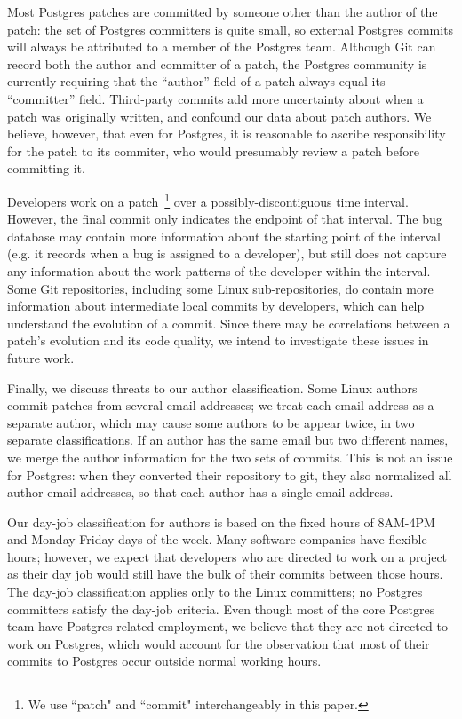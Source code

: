 Most Postgres patches are committed by someone other than the author
of the patch: the set of Postgres committers is quite small, so
external Postgres commits will always be attributed to a member of the
Postgres team. Although Git can record both the author and committer
of a patch, the Postgres community is currently requiring that the
``author'' field of a patch always equal its ``committer'' field.
Third-party commits add more uncertainty about when a patch was
originally written, and confound our data about patch authors.  We
believe, however, that even for Postgres, it is reasonable to ascribe
responsibility for the patch to its commiter, who would presumably
review a patch before committing it. 

Developers work on a patch~\footnote{We use ``patch" and ``commit" interchangeably in this paper.} over a possibly-discontiguous time
interval. However, the final commit only indicates the endpoint of
that interval.  The bug database may contain more information about
the starting point of the interval (e.g. it records when a bug is
assigned to a developer), but still does not capture any information
about the work patterns of the developer within the interval. Some Git
repositories, including some Linux sub-repositories, do contain more
information about intermediate local commits by developers, which can
help understand the evolution of a commit. Since there may be
correlations between a patch's evolution and its code quality, we
intend to investigate these issues in future work.

Finally, we discuss threats to our author classification. Some Linux
authors commit patches from several email addresses; we treat each
email address as a separate author, which may cause some authors to be
appear twice, in two separate classifications. If an author has the
same email but two different names, we merge the author information
for the two sets of commits. This is not an issue for Postgres: when
they converted their repository to git, they also normalized all author
email addresses, so that each author has a single email address.

Our day-job classification for authors is based on the fixed hours of
8AM-4PM and Monday-Friday days of the week.  Many software companies
have flexible hours; however, we expect that developers who are
directed to work on a project as their day job would still have the
bulk of their commits between those hours.  The day-job classification
applies only to the Linux committers; no Postgres committers satisfy
the day-job criteria. Even though most of the core Postgres team have
Postgres-related employment, we believe that they are not directed to
work on Postgres, which would account for the observation that most of
their commits to Postgres occur outside normal working hours.

